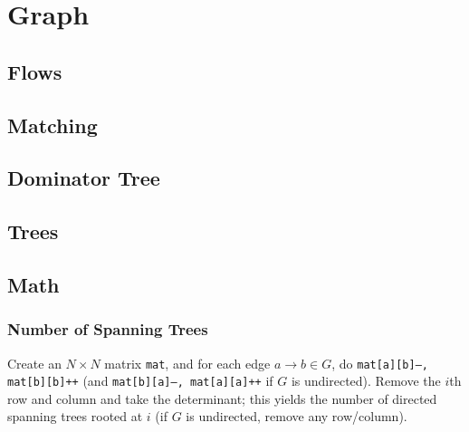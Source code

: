 \chapter{Graph}

\section{Flows}

\section{Matching}

\section{Dominator Tree}

\section{Trees}

\section{Math}
	\subsection{Number of Spanning Trees}
		Create an $N\times N$ matrix \texttt{mat}, and for each edge $a \rightarrow b \in G$, do
		\texttt{mat[a][b]--, mat[b][b]++} (and \texttt{mat[b][a]--, mat[a][a]++} if $G$ is undirected).
		Remove the $i$th row and column and take the determinant; this yields the number of directed spanning trees rooted at $i$
		(if $G$ is undirected, remove any row/column).

